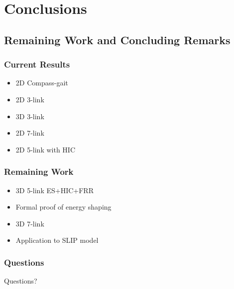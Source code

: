 \section{Conclusions}
\showtoc

\subsection{Remaining Work and Concluding Remarks}
\begin{frame}[t]
  \frametitle{Current Results}
  \begin{itemize}
  \item 2D Compass-gait
  \item 2D 3-link
  \item 3D 3-link
  \item 2D 7-link
  \item 2D 5-link with HIC
  \end{itemize}
\end{frame}

\begin{frame}[t]
  \frametitle{Remaining Work}
  \begin{itemize}
  \item 3D 5-link ES+HIC+FRR
  \item Formal proof of energy shaping
  \item 3D 7-link
  \item Application to SLIP model
  \end{itemize}
\end{frame}

\begin{frame}[t]
  \frametitle{Questions}
  \Large{Questions?}
\end{frame}
